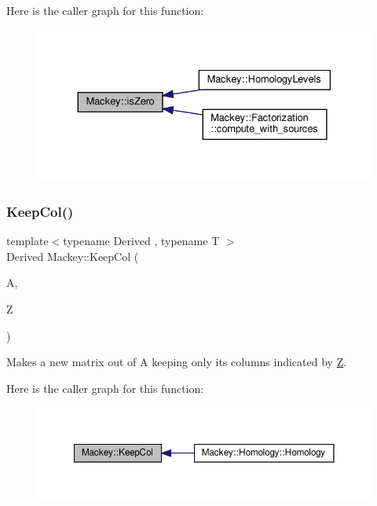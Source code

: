 Here is the caller graph for this function\+:\nopagebreak
\begin{figure}[H]
\begin{center}
\leavevmode
\includegraphics[width=330pt]{namespaceMackey_a4c3647777bc890a4649ae24b138bbb79_icgraph}
\end{center}
\end{figure}
\mbox{\label{namespaceMackey_a782d9ce52543c3ae3520b4859dda3240}} 
\subsubsection{\texorpdfstring{Keep\+Col()}{KeepCol()}}
{\footnotesize\ttfamily template$<$typename Derived , typename T $>$ \\
Derived Mackey\+::\+Keep\+Col (\begin{DoxyParamCaption}\item[{const Eigen\+::\+Dense\+Base$<$ Derived $>$ \&}]{A,  }\item[{const std\+::vector$<$ T $>$ \&}]{Z }\end{DoxyParamCaption})}



Makes a new matrix out of A keeping only its columns indicated by \hyperlink{classZ}{Z}. 

Here is the caller graph for this function\+:\nopagebreak
\begin{figure}[H]
\begin{center}
\leavevmode
\includegraphics[width=350pt]{namespaceMackey_a782d9ce52543c3ae3520b4859dda3240_icgraph}
\end{center}
\end{figure}
\mbox{\label{namespaceMackey_ae44b27dcf905a7ff976ebc79f197c579}} 
